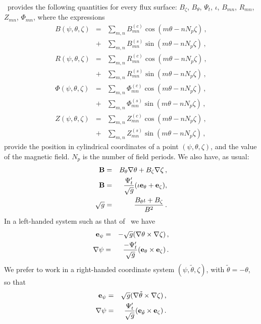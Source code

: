 \VMEC~provides the following quantities for every flux surface:  $B_\zeta$, $B_\theta$, $\Psi_t$, $\iota$, $B_{mn}$, $R_{mn}$, $Z_{mn}$, $\Phi_{mn}$, where the expressions
\begin{eqnarray}
B(\psi,\theta,\zeta) &=& \sum_{m,n}B_{mn}^{(c)}\cos{(m\theta-nN_p\zeta)}\,,\nonumber\\
&+& \sum_{m,n}B_{mn}^{(s)}\sin{(m\theta-nN_p\zeta)}\,,\nonumber\\
R(\psi,\theta,\zeta) &=& \sum_{m,n}R_{mn}^{(c)}\cos{(m\theta-nN_p\zeta)}\,,\nonumber\\
&+& \sum_{m,n}R_{mn}^{(s)}\sin{(m\theta-nN_p\zeta)}\,,\nonumber\\
\Phi(\psi,\theta,\zeta) &=& \sum_{m,n}\Phi_{mn}^{(c)}\cos{(m\theta-nN_p\zeta)}\,,\nonumber\\
&+& \sum_{m,n}\Phi_{mn}^{(s)}\sin{(m\theta-nN_p\zeta)}\,,\nonumber\\
Z(\psi,\theta,\zeta) &=& \sum_{m,n}Z_{mn}^{(c)}\cos{(m\theta-nN_p\zeta)}\,,\nonumber\\
&+& \sum_{m,n}Z_{mn}^{(s)}\sin{(m\theta-nN_p\zeta)}\,,
\end{eqnarray}
provide the position in cylindrical coordinates of a point $(\psi,\theta,\zeta)$, and the value of the magnetic field. $N_p$ is the number of field periods. We also have, as usual:
\begin{eqnarray}
\mathbf{B} &=& B_\theta\mathbf{\nabla \theta} + B_\zeta\mathbf{\nabla \zeta}\,,\nonumber\\
\mathbf{B} &=& \frac{\Psi_t'}{\sqrt{g}}(\iota\mathbf{e}_\theta + \mathbf{e}_\zeta),\nonumber\\
\sqrt{g} &=& \frac{B_\theta\iota + B_\zeta}{B^2}\,.
\end{eqnarray}
In a left-handed system such as that of \VMEC~we have
\begin{eqnarray}
\mathbf{e}_\psi &=&-\sqrt{g}(\nabla\theta\times\nabla\zeta)\,,\nonumber\\
\nabla\psi &=&\frac{-\Psi_t'}{\sqrt{g}}(\mathbf{e}_\theta\times\mathbf{e}_\zeta)\,.
\end{eqnarray}
We prefer to work in a right-handed coordinate system $(\psi,\tilde{\theta},\zeta)$, with $\tilde{\theta}=-\theta$, so that
\begin{eqnarray}
\mathbf{e}_\psi &=&\sqrt{g}(\nabla\tilde{\theta}\times\nabla\zeta)\,,\nonumber\\
\nabla\psi &=&\frac{\Psi_t'}{\sqrt{g}}(\mathbf{e}_{\tilde{\theta}}\times\mathbf{e}_\zeta)\,.\nonumber
\end{eqnarray}

